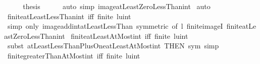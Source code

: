 \begin{isabellebody}
\ \ \isamarkupfalse%
\ \isamarkupfalse%
\ {\isacharquery}{\kern0pt}thesis\isanewline
\ \ \ \ \isamarkupfalse%
\ {\isacharparenleft}{\kern0pt}auto\ simp{\isacharcolon}{\kern0pt}\ image{\isacharunderscore}{\kern0pt}atLeastZeroLessThan{\isacharunderscore}{\kern0pt}int{\isacharparenright}{\kern0pt}\isanewline
{}\isamarkupfalse%
\ auto%
\endisatagproof
{\isafoldproof}%
%
\isadelimproof
\isanewline
%
\endisadelimproof
\isanewline
{}\isamarkupfalse%
\ finite{\isacharunderscore}{\kern0pt}atLeastLessThan{\isacharunderscore}{\kern0pt}int\ {\isacharbrackleft}{\kern0pt}iff{\isacharbrackright}{\kern0pt}{\isacharcolon}{\kern0pt}\ {\isachardoublequoteopen}finite\ {\isacharbraceleft}{\kern0pt}l{\isachardot}{\kern0pt}{\isachardot}{\kern0pt}{\isacharless}{\kern0pt}u{\isacharcolon}{\kern0pt}{\isacharcolon}{\kern0pt}int{\isacharbraceright}{\kern0pt}{\isachardoublequoteclose}\isanewline
%
\isadelimproof
\ \ %
\endisadelimproof
%
\isatagproof
{}\isamarkupfalse%
\ {\isacharparenleft}{\kern0pt}simp\ only{\isacharcolon}{\kern0pt}\ image{\isacharunderscore}{\kern0pt}add{\isacharunderscore}{\kern0pt}int{\isacharunderscore}{\kern0pt}atLeastLessThan\ {\isacharbrackleft}{\kern0pt}symmetric{\isacharcomma}{\kern0pt}\ of\ l{\isacharbrackright}{\kern0pt}\ finite{\isacharunderscore}{\kern0pt}imageI\ finite{\isacharunderscore}{\kern0pt}atLeastZeroLessThan{\isacharunderscore}{\kern0pt}int{\isacharparenright}{\kern0pt}%
\endisatagproof
{\isafoldproof}%
%
\isadelimproof
\isanewline
%
\endisadelimproof
\isanewline
{}\isamarkupfalse%
\ finite{\isacharunderscore}{\kern0pt}atLeastAtMost{\isacharunderscore}{\kern0pt}int\ {\isacharbrackleft}{\kern0pt}iff{\isacharbrackright}{\kern0pt}{\isacharcolon}{\kern0pt}\ {\isachardoublequoteopen}finite\ {\isacharbraceleft}{\kern0pt}l{\isachardot}{\kern0pt}{\isachardot}{\kern0pt}{\isacharparenleft}{\kern0pt}u{\isacharcolon}{\kern0pt}{\isacharcolon}{\kern0pt}int{\isacharparenright}{\kern0pt}{\isacharbraceright}{\kern0pt}{\isachardoublequoteclose}\isanewline
%
\isadelimproof
\ \ %
\endisadelimproof
%
\isatagproof
{}\isamarkupfalse%
\ {\isacharparenleft}{\kern0pt}subst\ atLeastLessThanPlusOne{\isacharunderscore}{\kern0pt}atLeastAtMost{\isacharunderscore}{\kern0pt}int\ {\isacharbrackleft}{\kern0pt}THEN\ sym{\isacharbrackright}{\kern0pt}{\isacharcomma}{\kern0pt}\ simp{\isacharparenright}{\kern0pt}%
\endisatagproof
{\isafoldproof}%
%
\isadelimproof
\isanewline
%
\endisadelimproof
\isanewline
{}\isamarkupfalse%
\ finite{\isacharunderscore}{\kern0pt}greaterThanAtMost{\isacharunderscore}{\kern0pt}int\ {\isacharbrackleft}{\kern0pt}iff{\isacharbrackright}{\kern0pt}{\isacharcolon}{\kern0pt}\ {\isachardoublequoteopen}finite\ {\isacharbraceleft}{\kern0pt}l{\isacharless}{\kern0pt}{\isachardot}{\kern0pt}{\isachardot}{\kern0pt}{\isacharparenleft}{\kern0pt}u{\isacharcolon}{\kern0pt}{\isacharcolon}{\kern0pt}int{\isacharparenright}{\kern0pt}{\isacharbraceright}{\kern0pt}{\isachardoublequoteclose}\isanewline

\end{isabellebody}
